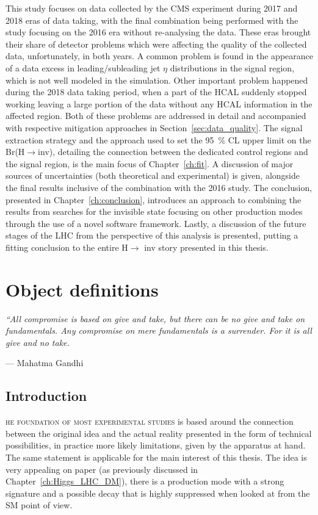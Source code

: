 \hspace{10pt} This study focuses on data collected by the CMS experiment during 2017 and 2018 eras of data taking, with the final combination being performed with the study focusing on the 2016 era without re-analysing the data. These eras brought their share of detector problems which were affecting the quality of the collected data, unfortunately, in both years. A common problem is found in the appearance of a data excess in leading/subleading jet $\eta$ distributions in the signal region, which is not well modeled in the simulation. Other important problem happened during the 2018 data taking period, when a part of the HCAL suddenly stopped working leaving a large portion of the data without any HCAL information in the affected region. Both of these problems are addressed in detail and accompanied with respective mitigation approaches in Section~\ref{sec:data_quality}. The signal extraction strategy and the approach used to set the 95~\% CL upper limit on the Br(H$\rightarrow$inv), detailing the connection between the dedicated control regions and the signal region, is the main focus of Chapter~\ref{ch:fit}. A discussion of major sources of uncertainties (both theoretical and experimental) is given, alongside the final results inclusive of the combination with the 2016 study. The conclusion, presented in Chapter~\ref{ch:conclusion}, introduces an approach to combining the results from searches for the invisible state focusing on other production modes through the use of a novel software framework. Lastly, a discussion of the future stages of the LHC from the perspective of this analysis is presented, putting a fitting conclusion to the entire H$\rightarrow$ inv story presented in this thesis.




\newpage
\chapter{Object definitions}
\label{ch:objects}
\epigraph{\itshape``All compromise is based on give and take, but there can be no give and take on fundamentals. Any compromise on mere fundamentals is a surrender. For it is all give and no take. }{--- \textup{Mahatma Gandhi}}


\section{Introduction}


\hspace{10pt}\lettrine[lines=2]{}{he foundation of most experimental studies} is based around the connection between the original idea and the actual reality presented in the form of technical possibilities, in practice more likely limitations, given by the apparatus at hand. The same statement is applicable for the main interest of this thesis. The idea is very appealing on paper (as previously discussed in Chapter~\ref{ch:Higgs_LHC_DM}), there is a production mode with a strong signature and a possible decay that is highly suppressed when looked at from the SM point of view.

